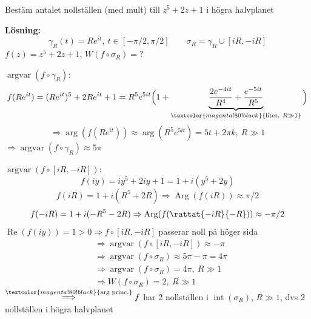\begin{example}
Bestäm antalet nollställen (med mult) till $z^5 + 2z + 1$ i högra halvplanet

\textbf{Lösning:}
\[ \gamma_R(t) = Re^{it},\ t \in [-\pi/2, \pi/2] \qquad \sigma_R = \gamma_R \cup [iR, -iR] \]
$f(z) = z^5 + 2z + 1$, \quad $W(f \circ \sigma_R) = ?$

\emph{$\operatorname{argvar}(f \circ \gamma_R)$}:
\[ f(Re^{it}) = (Re^{it})^5 + 2Re^{it} + 1 = R^5 e^{5it}\Big( 1 + \underbrace{\frac{2e^{-4it}}{R^4} + \frac{e^{-5it}}{R^5}}_{\textcolor{magenta!80!black}{\text{litet},\ R \gg 1}} \Big) \]
\[ \Rightarrow \arg(f(Re^{it})) \approx \arg(R^5 e^{5it}) = 5t + 2\pi k,\ R \gg 1 \]
$\Rightarrow \operatorname{argvar}(f \circ \gamma_R) \approx 5\pi$

\emph{$\operatorname{argvar}(f \circ [iR, -iR])$}:
\[ f(iy) = iy^5 + 2iy + 1 = 1 + i(y^5 + 2y) \]
\[ f(iR) = 1 + i(R^5 + 2R) \Rightarrow \operatorname{Arg}(f(iR)) \approx \pi/2 \]
\[ f(-iR) = 1 + i(-R^5 - 2R) \Rightarrow \operatorname{Arg}(f(\rattat{-iR}{-R})) \approx -\pi/2 \]
$\operatorname{Re}(f(iy)) = 1 > 0 \Rightarrow f \circ [iR, -iR]$ passerar noll på höger sida
\begin{align*}
  &\Rightarrow \operatorname{argvar}(f \circ [iR, -iR]) \approx -\pi \\
  &\Rightarrow \operatorname{argvar}(f \circ \sigma_R) \approx 5\pi - \pi = 4\pi \\
  &\Rightarrow \operatorname{argvar}(f \circ \sigma_R) = 4\pi,\ R \gg 1 \\
  &\Rightarrow W(f \circ \sigma_R) = 2,\ R \gg 1
\end{align*}
$\overset{\textcolor{magenta!80!black}{\text{arg princ.}}}{\Longrightarrow} f$ har 2 nollställen i $\operatorname{int}(\sigma_R)$, $R \gg 1$, dvs 2 nollställen i högra halvplanet
\end{example}
